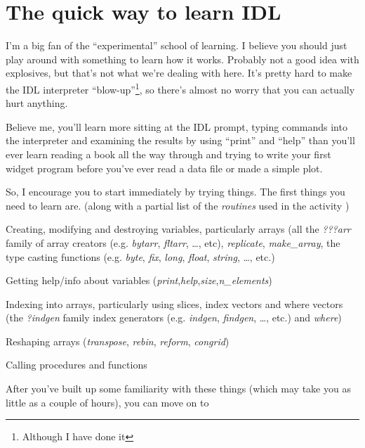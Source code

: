 \section{The quick way to learn IDL}\label{qs-learning-idl}

I'm a big fan of the ``experimental'' school of learning. I believe you
should just play around with something to learn how it works. Probably
not a good idea with explosives, but that's not what we're dealing with
here. It's pretty hard to make the IDL interpreter
``blow-up''\footnote{Although I have done it}, so there's almost no
worry that you can actually hurt anything. 

Believe me, you'll learn more sitting at the IDL prompt, typing commands
into the interpreter and examining the results by using ``print'' and
``help'' than you'll ever learn reading a book all the way through and
trying to write your first widget program before you've ever read a data
file or made a simple plot.

So, I encourage you to start immediately by trying things. The first
things you need to learn are. (along with a partial list of the \textit{routines}
used in the activity )

\be

  \item Creating, modifying and destroying variables, particularly
  arrays (all the \textit{???arr} family of array creators
  (e.g. \textit{bytarr}, \textit{fltarr}, \ldots, etc),
  \textit{replicate}, \textit{make\_array}, the type casting functions
  (e.g. \textit{byte}, \textit{fix}, \textit{long}, \textit{float},
  \textit{string}, \ldots, etc.)

  \item Getting help/info about variables (\textit{print},\textit{help},\textit{size},\textit{n\_elements})

  \item Indexing into arrays, particularly using slices, index vectors
  and where vectors (the \textit{?indgen} family index generators
  (e.g. \textit{indgen}, \textit{findgen}, \ldots, etc.) and \textit{where})


  \item Reshaping arrays (\textit{transpose}, \textit{rebin}, \textit{reform},
\textit{congrid})

  \item Calling procedures and functions

\ee

  After you've built up some familiarity with these things (which may
  take you as little  as a couple of hours), you can move on to


